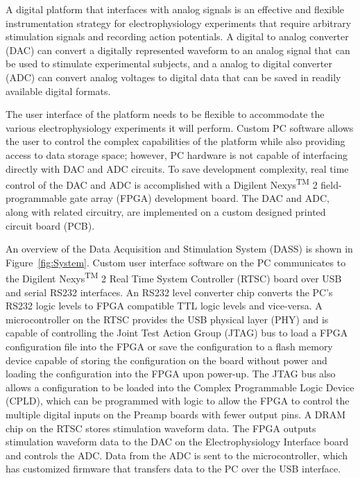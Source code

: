 A digital platform that interfaces with analog signals is an effective and flexible instrumentation strategy for electrophysiology experiments that require arbitrary stimulation signals and recording action potentials.  A digital to analog converter (DAC) can convert a digitally represented waveform to an analog signal that can be used to stimulate experimental subjects, and a analog to digital converter (ADC) can convert analog voltages to digital data that can be saved in readily available digital formats.

The user interface of the platform needs to be flexible to accommodate the various electrophysiology experiments it will perform.  Custom PC software allows the user to control the complex capabilities of the platform while also providing access to data storage space; however, PC hardware is not capable of interfacing directly with DAC and ADC circuits.  To save development complexity, real time control of the DAC and ADC is accomplished with a Digilent\textsuperscript{\textregistered} Nexys\textsuperscript{TM} 2 field-programmable gate array (FPGA) development board.  The DAC and ADC, along with related circuitry, are implemented on a custom designed printed circuit board (PCB).

An overview of the Data Acquisition and Stimulation System (DASS) is shown in Figure~\ref{fig:System}.  Custom user interface software on the PC communicates to the Digilent\textsuperscript{\textregistered} Nexys\textsuperscript{TM} 2 Real Time System Controller (RTSC) board over USB and serial RS232 interfaces.  An RS232 level converter chip converts the PC's RS232 logic levels to FPGA compatible TTL logic levels and vice-versa.  A microcontroller on the RTSC provides the USB physical layer (PHY) and is capable of controlling the Joint Test Action Group (JTAG) bus to load a FPGA configuration file into the FPGA or save the configuration to a flash memory device capable of storing the configuration on the board without power and loading the configuration into the FPGA upon power-up.  The JTAG bus also allows a configuration to be loaded into the Complex Programmable Logic Device (CPLD), which can be programmed with logic to allow the FPGA to control the multiple digital inputs on the Preamp boards with fewer output pins.  A DRAM chip on the RTSC stores stimulation waveform data.  The FPGA outputs stimulation waveform data to the DAC on the Electrophysiology Interface board and controls the ADC.  Data from the ADC is sent to the microcontroller, which has customized firmware that transfers data to the PC over the USB interface.

